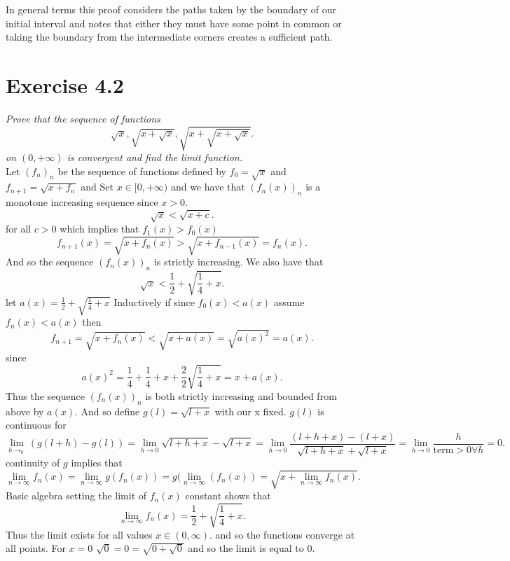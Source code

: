 \documentclass{amsart}
\begin{document}
    In general terms this proof considers the paths taken by the boundary of our initial interval and notes that either they must have some point in common or taking the boundary
    from the intermediate corners creates a sufficient path.

    \section{Exercise 4.2}
    \emph{
        Prove that the sequence of functions
        \[
         \sqrt{x}, \sqrt{x+\sqrt{x}}, \sqrt{x+\sqrt{x+\sqrt{x}}}
        .\] 
        on $(0,+\infty)$ is convergent and find the limit function.
    }\\
    Let $(f_n)_n$ be the sequence of functions defined by $f_0 = \sqrt{x}$ and $f_{n+1} = \sqrt{x+f_{n}}$ and 
    Set $x \in [0, +\infty)$ and
    we have that $(f_n(x))_n$ is a monotone increasing sequence since $x > 0$.
    \[
        \sqrt{x} < \sqrt{x+c}       
    .\] 
    for all $c > 0$ which implies that $f_{1}(x) > f_0(x)$
    \[
        f_{n+1}(x) = \sqrt{x+f_{n}(x)} > \sqrt{x+f_{n-1}(x)} = f_n(x)
    .\] 
    And so the sequence $(f_n(x))_n$ is strictly increasing.
    We also have that 
    \[
    \sqrt{x} < \frac{1}{2} + \sqrt{\frac{1}{4}+x}
    .\] 
    let $a(x) = \frac{1}{2}+ \sqrt{\frac{1}{4}+x}$
    Inductively if since $f_0(x) < a(x)$ assume $f_n(x) < a(x)$ then
     \[
         f_{n+1} = \sqrt{x + f_n(x)} < \sqrt{x +a(x)} = \sqrt{a(x)^2}  = a(x)
    .\] 
    since
    \[
    a(x)^2 = \frac{1}{4} + \frac{1}{4} + x + \frac{2}{2}\sqrt{\frac{1}{4}+x} = x + a(x)
    .\] 
    Thus the sequence $(f_n(x))_n$ is both strictly increasing and bounded from above by $a(x)$.
    And so define $g(l) = \sqrt{l+x}$ with our x fixed.
    $g(l)$ is continuous for 
    \[
        \lim_{h\to_0}(g(l+h) - g(l)) = \lim_{h\to 0} \sqrt{l+h+x} - \sqrt{l+x} = \lim_{h\to 0} \frac{(l+h+x)-(l+x)}{\sqrt{l+h+x} + \sqrt{l+x}} =\lim_{h\to 0} \frac{h}{\text{term} > 0 \forall h} = 0
    .\] 
    continuity of $g$ implies that
    \[
    \lim_{n\to\infty}f_n(x) = \lim_{n\to\infty}g(f_n(x)) = g(\lim_{n\to\infty}(f_n(x)) = \sqrt{x+\lim_{n\to\infty}f_n(x)}
    .\] 
    Basic algebra setting the limit of $f_n(x)$ constant shows that
    \[
    \lim_{n\to\infty}f_n(x) = \frac{1}{2} + \sqrt{\frac{1}{4}+x}
    .\] 
    Thus the limit exists for all values $x \in (0,\infty)$. and so the functions converge at all points.
    For $x = 0$ $\sqrt{0}= 0 = \sqrt{0 + \sqrt{0}}$ and so the limit is equal to 0.
\end{document}
